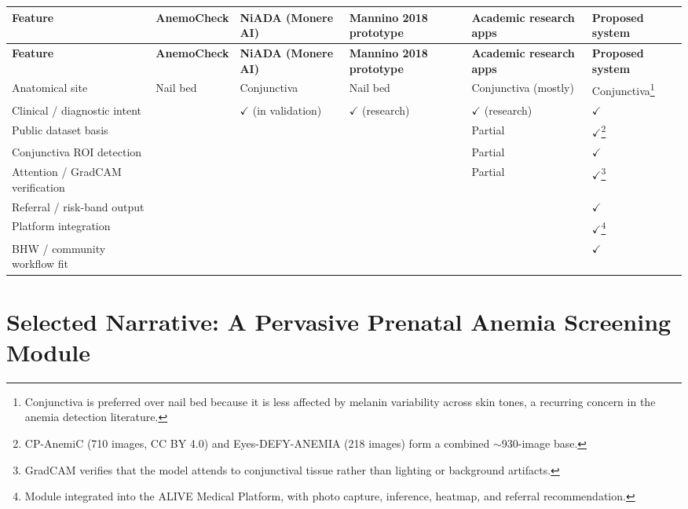 \documentclass[11pt]{article}
\begin{document}
    {\scriptsize
    \begin{longtable}{p{} p{} p{} p{} p{} p{}}
    \toprule
    \textbf{Feature} & \textbf{AnemoCheck} & \textbf{NiADA (Monere AI)} & \textbf{Mannino 2018 prototype} & \textbf{Academic research apps} & \textbf{Proposed system} \\
    \midrule
    \endfirsthead
    \toprule
    \textbf{Feature} & \textbf{AnemoCheck} & \textbf{NiADA (Monere AI)} & \textbf{Mannino 2018 prototype} & \textbf{Academic research apps} & \textbf{Proposed system} \\
    \midrule
    \endhead
    Anatomical site & Nail bed & Conjunctiva & Nail bed & Conjunctiva (mostly) & Conjunctiva\footnote{Conjunctiva is preferred over nail bed because it is less affected by melanin variability across skin tones, a recurring concern in the anemia detection literature.} \\

    Clinical / diagnostic intent &  & $\checkmark$ (in validation) & $\checkmark$ (research) & $\checkmark$ (research) & $\checkmark$ \\

    Public dataset basis &  &  &  & Partial & $\checkmark$\footnote{CP-AnemiC (710 images, CC BY 4.0) and Eyes-DEFY-ANEMIA (218 images) form a combined $\sim$930-image base.} \\

    Conjunctiva ROI detection &  &  &  & Partial & $\checkmark$ \\

    Attention / GradCAM verification &  &  &  & Partial & $\checkmark$\footnote{GradCAM verifies that the model attends to conjunctival tissue rather than lighting or background artifacts.} \\

    Referral / risk-band output &  &  &  &  & $\checkmark$ \\

    Platform integration &  &  &  &  & $\checkmark$\footnote{Module integrated into the ALIVE Medical Platform, with photo capture, inference, heatmap, and referral recommendation.} \\

    BHW / community workflow fit &  &  &  &  & $\checkmark$ \\
    \bottomrule
    \end{longtable}
    }

    \section{Selected Narrative: A Pervasive Prenatal Anemia Screening Module}
\end{document}

